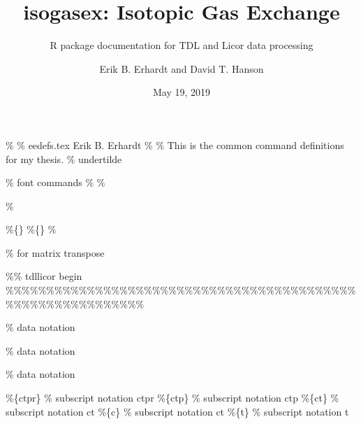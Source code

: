 \documentclass[]{article}
\title{isogasex: Isotopic Gas Exchange}
\subtitle{R package documentation for TDL and Licor data processing}
\author{Erik B. Erhardt and David T. Hanson}
\date{May 19, 2019}
\begin{document}
\maketitle

{
\setcounter{tocdepth}{5}
\tableofcontents
}
\% \% eedefs.tex Erik B. Erhardt \% \% This is the common command
definitions for my thesis. \% undertilde

\% font commands \newcommand{\defin}{\bf}
\%\renewcommand{\vector}{\utilde} \renewcommand{\utilde}{} \% \mathbf
\renewcommand{\matrix}{\mathbf} \renewcommand{\permil}{‰}
\renewcommand{\circ}{°}

\%\newcommand{\Normal}          {\mathcal{N}}

\newcommand{\Normal}          {\textrm{Normal}}
\newcommand{\Wishart}         {\textrm{Wishart}}

\%\{\} \newcommand{\IWishart}        {\textrm{Inv-Wishart}}
\newcommand{\Chisq}           {\textrm{scaled-$\chi^2$}}
\%\{\}
\newcommand{\IChisq}          {\textrm{Scaled-inv-$\chi^2$}}
\%\newcommand{\Dirichlet}       {\mathcal{D}\textrm{ir}}

\newcommand{\Dirichlet}       {\textrm{Dirichlet}}
\newcommand{\dBeta}           {\textrm{Beta}}
\newcommand{\dGamma}          {\textrm{Gamma}}
\newcommand{\dIGamma}         {\textrm{Inv-Gamma}}
\newcommand{\Uniform}         {\textrm{Uniform}}

\newcommand{\transpose}       {\top}

\% for matrix transpose

\%\% tdllicor begin
\%\%\%\%\%\%\%\%\%\%\%\%\%\%\%\%\%\%\%\%\%\%\%\%\%\%\%\%\%\%\%\%\%\%\%\%\%\%\%\%\%\%\%\%\%\%\%\%\%\%\%\%\%\%\%\%\%\%\%\%
\newcommand{\tdllicor}{\texttt{tdllicor}}

\newcommand{\data}[1]{\tilde{#1}}

\% data notation

\newcommand{\sdatasig}[1]{\sigma_{#1}^2}

\% data notation

\newcommand{\vdatasig}[1]{\Sigma_{#1}}

\% data notation

\newcommand{\subctpr}{}

\%\{ctpr\} \% subscript notation ctpr \newcommand{\subctp} {}\%\{ctp\}
\% subscript notation ctp \newcommand{\subct}  {}\%\{ct\} \% subscript
notation ct \newcommand{\subc}   {}\%\{c\} \% subscript notation ct
\newcommand{\subt}   {}\%\{t\} \% subscript notation t
\end{document}
